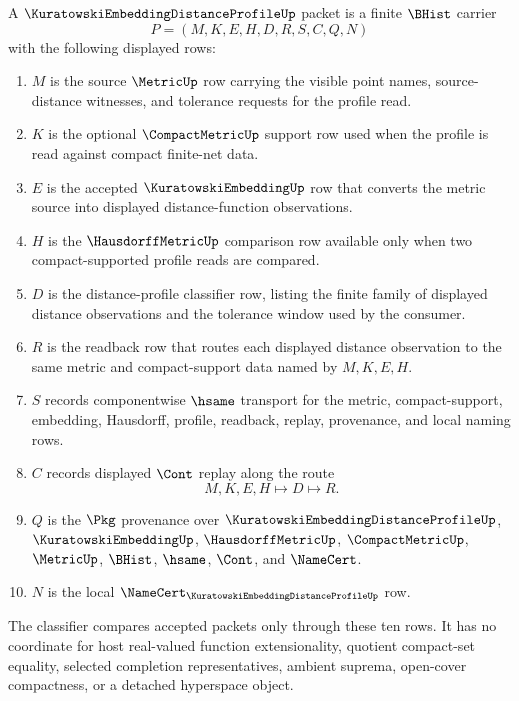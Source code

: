 \begin{definition}
\label{def:kuratowski-embedding-distance-profile-packet}
A $\KuratowskiEmbeddingDistanceProfileUp$ packet is a finite $\BHist$ carrier
$$
P=(M,K,E,H,D,R,S,C,Q,N)
$$
with the following displayed rows:
\begin{enumerate}
\item $M$ is the source $\MetricUp$ row carrying the visible point names, source-distance witnesses, and tolerance requests for the profile read.
\item $K$ is the optional $\CompactMetricUp$ support row used when the profile is read against compact finite-net data.
\item $E$ is the accepted $\KuratowskiEmbeddingUp$ row that converts the metric source into displayed distance-function observations.
\item $H$ is the $\HausdorffMetricUp$ comparison row available only when two compact-supported profile reads are compared.
\item $D$ is the distance-profile classifier row, listing the finite family of displayed distance observations and the tolerance window used by the consumer.
\item $R$ is the readback row that routes each displayed distance observation to the same metric and compact-support data named by $M,K,E,H$.
\item $S$ records componentwise $\hsame$ transport for the metric, compact-support, embedding, Hausdorff, profile, readback, replay, provenance, and local naming rows.
\item $C$ records displayed $\Cont$ replay along the route
$$
M,K,E,H \longmapsto D \longmapsto R .
$$
\item $Q$ is the $\Pkg$ provenance over $\KuratowskiEmbeddingDistanceProfileUp$, $\KuratowskiEmbeddingUp$, $\HausdorffMetricUp$, $\CompactMetricUp$, $\MetricUp$, $\BHist$, $\hsame$, $\Cont$, and $\NameCert$.
\item $N$ is the local $\NameCert_{\KuratowskiEmbeddingDistanceProfileUp}$ row.
\end{enumerate}
The classifier compares accepted packets only through these ten rows. It has no coordinate for host real-valued function extensionality, quotient compact-set equality, selected completion representatives, ambient suprema, open-cover compactness, or a detached hyperspace object.
\end{definition}

